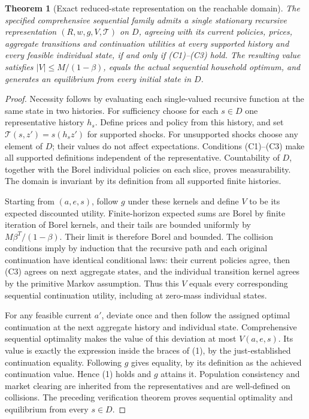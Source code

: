 \documentclass[11pt]{article}
\newtheorem{theorem}{Theorem}
\theoremstyle{remark}
\begin{document}
\begin{theorem}[Exact reduced-state representation on the reachable domain]
The specified comprehensive sequential family admits a single stationary
recursive representation $(R,w,g,V,\mathcal T)$ on $D$, agreeing with
its current policies, prices, aggregate transitions and continuation
utilities at every supported history and every feasible individual state,
if and only if (C1)--(C3) hold.
The resulting value satisfies $|V|\leq M/(1-\beta)$, equals the actual
sequential household optimum, and generates an equilibrium from every
initial state in $D$.
\end{theorem}
\begin{proof}
Necessity follows by evaluating each single-valued recursive function at
the same state in two histories. For sufficiency choose for each $s\in D$
one representative history $h_s$. Define prices and policy from this
history, and set $\mathcal T(s,z')=s(h_s z')$ for supported shocks.
For unsupported shocks choose any element of $D$; their values do not
affect expectations. Conditions (C1)--(C3) make all supported definitions
independent of the representative. Countability of $D$, together with
the Borel individual policies on each slice, proves measurability.
The domain is invariant by its definition from all supported finite
histories.

Starting from $(a,e,s)$, follow $g$ under these kernels and define $V$ to
be its expected discounted utility. Finite-horizon expected sums are
Borel by finite iteration of Borel kernels, and their tails are bounded
uniformly by $M\beta^T/(1-\beta)$. Their limit is therefore Borel and
bounded. The collision conditions imply by induction that the recursive
path and each original continuation have identical conditional laws:
their current policies agree, then (C3) agrees on next aggregate states,
and the individual transition kernel agrees by the primitive Markov
assumption. Thus this $V$ equals every corresponding sequential
continuation utility, including at zero-mass individual states.

For any feasible current $a'$, deviate once and then follow the assigned
optimal continuation at the next aggregate history and individual state.
Comprehensive sequential optimality makes the value of this deviation
at most $V(a,e,s)$. Its value is exactly the expression inside the
braces of (1), by the just-established continuation equality. Following
$g$ gives equality, by its definition as the achieved continuation
value. Hence (1) holds and $g$ attains it. Population consistency and
market clearing are inherited from the representatives and are
well-defined on collisions. The preceding verification theorem proves
sequential optimality and equilibrium from every $s\in D$.
\end{proof}
\end{document}
